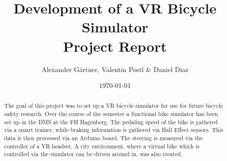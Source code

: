 \documentclass[english,notitlepage,smartquotes]{hgbreport}
\begin{document}

\author{Alexander Gärtner, Valentin Postl \& Daniel Diaz}                    %
\title{Development of a VR Bicycle Simulator\\ %
			Project Report}	                 %
\date{\today}

\maketitle

\begin{abstract}\noindent

The goal of this project was to set up a VR bicycle simulator for use for future bicycle safety research.
Over the course of the semester a functional bike simulator has been set up in the DMS at the FH Hagenberg. The pedaling speed of the bike is gathered via a smart trainer, while braking information is gathered via Hall Effect sensors. This data is then processed via an Arduino board. The steering is measured via the controller of a VR headset. A city environment, where a virtual bike which is controlled via the simulator can be driven around in, was also created.
\end{abstract}

\tableofcontents

\end{document}
